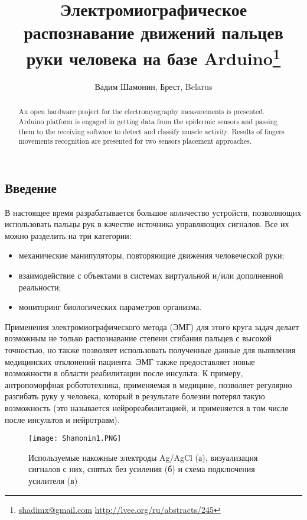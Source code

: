 \documentclass[10pt, a5paper]{article}
\begin{document}
\title{Электромиографическое распознавание движений пальцев руки человека на базе Arduino\footnote{\url{shadimx@gmail.com} \url{http://lvee.org/ru/abstracts/245}}}
\author{Вадим Шамонин, Брест, Belarus}
\maketitle
\begin{abstract}
An open hardware project for the electromyography measurements is presented. Arduino platform is engaged in getting data from the epidermic sensors and passing them to the receiving software to detect and classify muscle activity. Results of fingers movements recognition are presented for two sensors placement approaches.
\end{abstract}
\subsection*{Введение}

В настоящее время разрабатывается большое количество устройств, позволяющих использовать пальцы рук в качестве источника управляющих сигналов. Все их можно разделить на три категории:

\begin{itemize}
  \item механические манипуляторы, повторяющие движения человеческой руки;
  \item взаимодействие с объектами в системах виртуальной и/или дополненной реальности;
  \item мониторинг биологических параметров организма.
\end{itemize}

Применения электромиографического метода (ЭМГ) для этого круга задач делает возможным не только распознавание степени сгибания пальцев с высокой точностью, но также позволяет использовать полученные данные для выявления медицинских отклонений пациента. ЭМГ также предоставляет новые возможности в области реабилитации после инсульта. К примеру, антропоморфная робототехника, применяемая в медицине, позволяет регулярно разгибать руку у человека, который в результате болезни потерял такую возможность (это называется нейрореабилитацией, и применяется в том числе после инсультов и нейротравм).

\begin{center}

\begin{figure}[h!]
  \centering
  \texttt{[image: Shamonin1.PNG]}
  \caption{Используемые накожные электроды Ag/AgCl (а), визуализация сигналов с них, снятых без усиления (б) и схема подключения усилителя (в)}
  \label{Shamonin1}

\end{figure}

\end{center}
\end{document}
